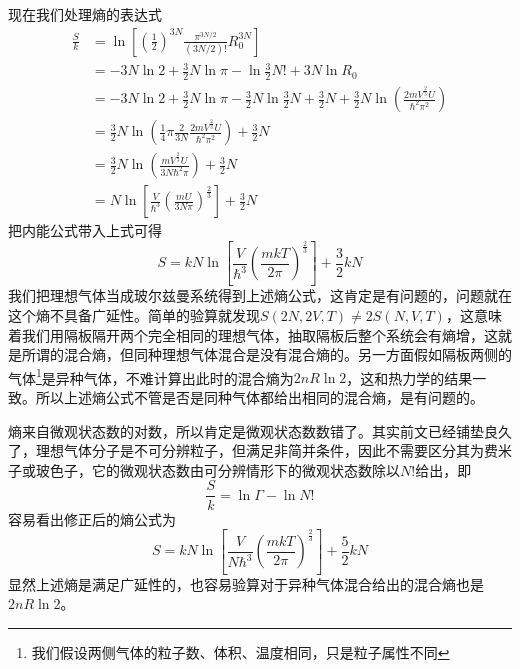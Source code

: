 \documentclass[../../main.tex]{subfiles}
\begin{document}
现在我们处理熵的表达式
\begin{equation*}
    \begin{split}
        \frac{S}{k}&=\ln\left[\left(\frac{1}{2}\right)^{3N}\frac{\pi^{3N/2}}{(3N/2)!}R_0^{3N}\right] \\
        &=-3N\ln2+\frac{3}{2}N\ln\pi-\ln\frac{3}{2}N!+3N\ln R_0 \\
        &=-3N\ln2+\frac{3}{2}N\ln\pi-\frac{3}{2}N\ln\frac{3}{2}N+\frac{3}{2}N+\frac{3}{2}N\ln(\frac{2mV^{\frac{2}{3}}U}{\hbar^2\pi^2}) \\
        &=\frac{3}{2}N\ln(\frac{1}{4}\pi\frac{2}{3N}\frac{2mV^{\frac{2}{3}}U}{\hbar^2\pi^2})+\frac{3}{2}N \\
        &=\frac{3}{2}N\ln(\frac{mV^{\frac{2}{3}}U}{3N\hbar^2\pi})+\frac{3}{2}N \\
        &=N\ln\left[\frac{V}{\hbar^3}\left(\frac{mU}{3N\pi}\right)^{\frac{2}{3}}\right]+\frac{3}{2}N
    \end{split}
\end{equation*}
把内能公式带入上式可得
\begin{equation}
    S=kN\ln\left[\frac{V}{\hbar^3}\left(\frac{mkT}{2\pi}\right)^{\frac{2}{3}}\right]+\frac{3}{2}kN
\end{equation}
我们把理想气体当成玻尔兹曼系统得到上述熵公式，这肯定是有问题的，问题就在这个熵不具备广延性。简单的验算就发现\(S(2N,2V,T)\neq 2S(N,V,T)\)，这意味着我们用隔板隔开两个完全相同的理想气体，抽取隔板后整个系统会有熵增，这就是所谓的混合熵，但同种理想气体混合是没有混合熵的。另一方面假如隔板两侧的气体\footnote{我们假设两侧气体的粒子数、体积、温度相同，只是粒子属性不同}是异种气体，不难计算出此时的混合熵为\(2nR\ln2\)，这和热力学的结果一致。所以上述熵公式不管是否是同种气体都给出相同的混合熵，是有问题的。

熵来自微观状态数的对数，所以肯定是微观状态数数错了。其实前文已经铺垫良久了，理想气体分子是不可分辨粒子，但满足非简并条件，因此不需要区分其为费米子或玻色子，它的微观状态数由可分辨情形下的微观状态数除以\(N!\)给出，即
\begin{equation}
    \frac{S}{k}=\ln\Gamma-\ln N!
\end{equation}
容易看出修正后的熵公式为
\begin{equation}
    S=kN\ln\left[\frac{V}{N\hbar^3}\left(\frac{mkT}{2\pi}\right)^{\frac{2}{3}}\right]+\frac{5}{2}kN
\end{equation}
显然上述熵是满足广延性的，也容易验算对于异种气体混合给出的混合熵也是\(2nR\ln 2\)。
\end{document}
